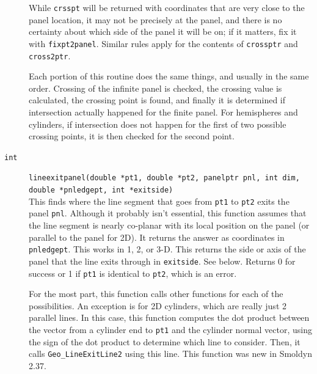 \documentclass {scrbook}
\newcommand {\ttt} {\texttt}
\begin{document}
\begin{description}
While \ttt{crsspt} will be returned with coordinates that are very close to the panel location, it may not be precisely at the panel, and there is no certainty about which side of the panel it will be on; if it matters, fix it with \ttt{fixpt2panel}. Similar rules apply for the contents of \ttt{crossptr} and \ttt{cross2ptr}.

Each portion of this routine does the same things, and usually in the same order. Crossing of the infinite panel is checked, the crossing value is calculated, the crossing point is found, and finally it is determined if intersection actually happened for the finite panel. For hemispheres and cylinders, if intersection does not happen for the first of two possible crossing points, it is then checked for the second point.

\item[\ttt{int}]
\ttt{lineexitpanel(double *pt1, double *pt2, panelptr pnl, int dim, double *pnledgept, int *exitside)}
\hfill \\
This finds where the line segment that goes from \ttt{pt1} to \ttt{pt2} exits the panel \ttt{pnl}. Although it probably isn't essential, this function assumes that the line segment is nearly co-planar with its local position on the panel (or parallel to the panel for 2D). It returns the answer as coordinates in \ttt{pnledgept}. This works in 1, 2, or 3-D. This returns the side or axis of the panel that the line exits through in \ttt{exitside}. See below. Returns 0 for success or 1 if \ttt{pt1} is identical to \ttt{pt2}, which is an error.

For the most part, this function calls other functions for each of the possibilities. An exception is for 2D cylinders, which are really just 2 parallel lines. In this case, this function computes the dot product between the vector from a cylinder end to \ttt{pt1} and the cylinder normal vector, using the sign of the dot product to determine which line to consider. Then, it calls \ttt{Geo\_LineExitLine2} using this line. This function was new in Smoldyn 2.37.


\end{description}
\end{document}
